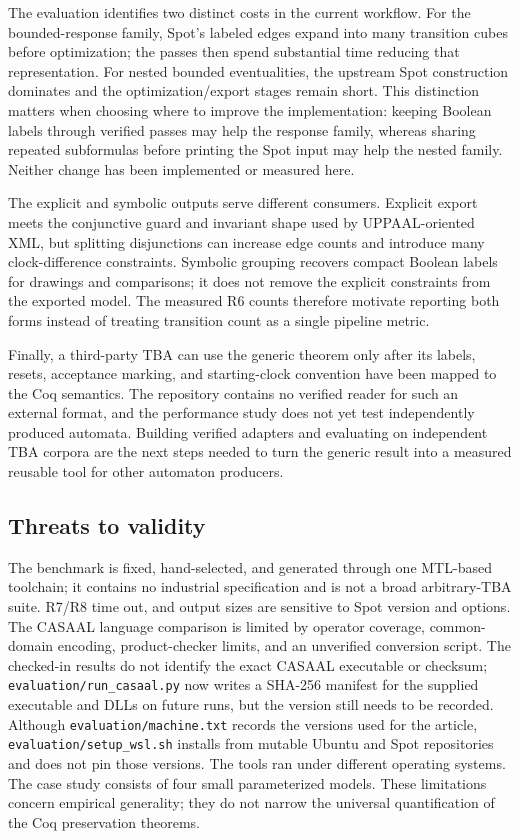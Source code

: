 \documentclass{ieeeaccess}
\begin{document}
The evaluation identifies two distinct costs in the current workflow. For
the bounded-response family, Spot's labeled edges expand into many transition
cubes before optimization; the passes then spend substantial time reducing
that representation. For nested bounded eventualities, the upstream Spot
construction dominates and the optimization/export stages remain short. This
distinction matters when choosing where to improve the implementation: keeping
Boolean labels through verified passes may help the response family, whereas
sharing repeated subformulas before printing the Spot input may help the nested
family. Neither change has been implemented or measured here.

The explicit and symbolic outputs serve different consumers. Explicit export
meets the conjunctive guard and invariant shape used by UPPAAL-oriented XML,
but splitting disjunctions can increase edge counts and introduce many
clock-difference constraints. Symbolic grouping recovers compact Boolean
labels for drawings and comparisons; it does not remove the explicit
constraints from the exported model. The measured R6 counts therefore
motivate reporting both forms instead of treating transition count as a single
pipeline metric.

Finally, a third-party TBA can use the generic theorem only after its labels,
resets, acceptance marking, and starting-clock convention have been mapped to
the Coq semantics. The repository contains no verified reader for such an
external format, and the performance study does not yet test independently
produced automata. Building verified adapters and evaluating on independent
TBA corpora are the next steps needed to turn the generic result into a
measured reusable tool for other automaton producers.

\subsection{Threats to validity}
The benchmark is fixed, hand-selected, and generated through one MTL-based toolchain; it contains no industrial specification and is not a broad arbitrary-TBA suite. R7/R8 time out, and output sizes are sensitive to Spot version and options. The CASAAL language comparison is limited by operator coverage, common-domain encoding, product-checker limits, and an unverified conversion script. The checked-in results do not identify the exact CASAAL executable or checksum; \texttt{evaluation/run\_casaal.py} now writes a SHA-256 manifest for the supplied executable and DLLs on future runs, but the version still needs to be recorded. Although \texttt{evaluation/machine.txt} records the versions used for the article, \texttt{evaluation/setup\_wsl.sh} installs from mutable Ubuntu and Spot repositories and does not pin those versions. The tools ran under different operating systems. The case study consists of four small parameterized models. These limitations concern empirical generality; they do not narrow the universal quantification of the Coq preservation theorems.
\end{document}
